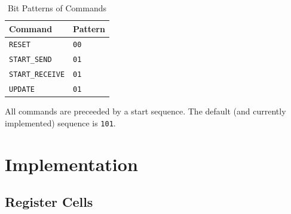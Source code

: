 \documentclass[parskip=half]{scrartcl}
\let\command=\texttt
\begin{document}
    \begin{table}[htb]
        \centering
        \begin{tabular}{ll}
            \toprule
            Command                     & Pattern \\
            \midrule
            \command{RESET}             & \command{00} \\
            \command{START\_SEND}       & \command{01} \\
            \command{START\_RECEIVE}    & \command{01} \\
            \command{UPDATE}            & \command{01} \\
            \bottomrule
        \end{tabular}
        \caption{Bit Patterns of Commands}
        \label{tab:commandpatterns}
    \end{table}

    All commands are preceeded by a start sequence.
    The default (and currently implemented) sequence is \command{101}.

    \section{Implementation}
    \subsection{Register Cells}
\end{document}
